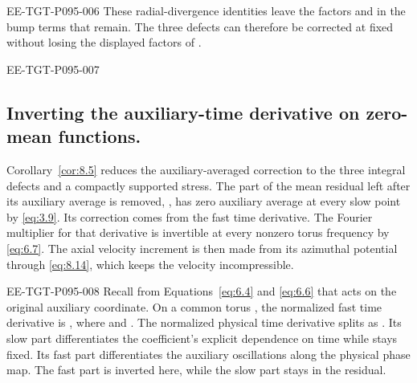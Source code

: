 \begin{EESegment}{EE-TGT-P095-006}
These radial-divergence identities leave the factors
 and
 in the bump terms
that remain. The three defects can therefore be corrected at fixed
 without losing the displayed factors of
.
\end{EESegment}

\begin{EESegment}{EE-TGT-P095-007}
\subsection{Inverting the auxiliary-time derivative on zero-mean functions.}\label{sec:8.5}
Corollary~\ref{cor:8.5} reduces the auxiliary-averaged correction to the three integral defects and
a compactly supported stress. The part of the mean residual left after its auxiliary average is
removed, , has zero auxiliary average at every
slow point by \eqref{eq:3.9}. Its correction comes from the fast time derivative. The Fourier
multiplier for that derivative is invertible at every nonzero torus frequency by \eqref{eq:6.7}. The
axial velocity increment is then made from its azimuthal potential through \eqref{eq:8.14}, which
keeps the velocity incompressible.
\end{EESegment}

\begin{EESegment}{EE-TGT-P095-008}
Recall from Equations~\eqref{eq:6.4} and \eqref{eq:6.6} that
 acts on the original auxiliary
coordinate. On a common torus , the normalized fast time
derivative is , where
 and
. The normalized physical time derivative splits
as . Its slow part
 differentiates the coefficient's explicit dependence
on time while  stays fixed. Its fast part
 differentiates the auxiliary oscillations along the physical
phase map. The fast part is inverted here, while the slow part stays in the residual.
\end{EESegment}

